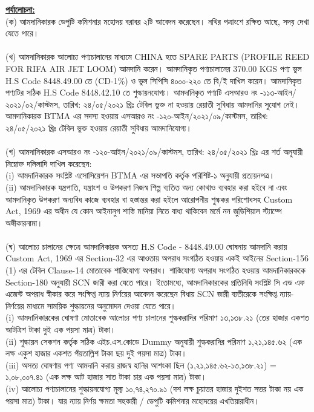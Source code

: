 \documentclass[12pt]{article}
\newcommand{\hscode}{8448.42.10}
\newcommand{\sroooth}{এসআরও নং -১১৩-আইন/২০২১/০২/কাস্টমস}
\newcommand{\srooothd}{তারিখ: ২৪/০৫/২০২১ খ্রিঃ}
\newcommand{\srooot}{এসআরও নং -১২০-আইন/২০২১/০৯/কাস্টমস}
\newcommand{\sroootd}{তারিখ: ২৪/০৫/২০২১ খ্রিঃ}
\begin{document}
\begin{minipage}[t]{0.95\linewidth}
\underline{\textbf{পর্যালোচনা:}}
\\
(ক) আমদানিকারক ডেপুটি কমিশনার মহোদয় বরাবর
২টি আবেদন করেছেন। নথির পত্রাংশে রক্ষিত আছে, সদয়
দেখা যেতে পারে।
\\
\\
(খ) আমদানিকারক আলোচ্য পণ্যচালানের মাধ্যমে CHINA
হতে SPARE PARTS (PROFILE REED FOR RIFA AIR JET LOOM) আমদানি করেন। আমদানিকৃত পণ্যচালানের
370.00 KGS পণ্য ভুল H.S Code 8448.49.00
তে (CD-1\%) ও ভুল সিপিসি ৪০০০-২২০ তে বি/ই
দাখিল করেন। আমদানিকৃত পণ্যটির সঠিক H.S Code
{\hscode} তে শুল্কায়নযোগ্য। আমদানিকৃত পণ্যটি
{\sroooth}, {\srooothd} টেবিল ভুক্ত না হওয়ায় রেয়াতী সুবিধায়
আমদানির সুযোগ নেই। আমদানিকারক BTMA এর
সদস্য হওয়ায় {\srooot}, {\sroootd} টেবিল ভুক্ত হওয়ায় রেয়াতী সুবিধায় আমদানিযোগ্য।
\\
\\
(গ) আমদানিকারক {\srooot}, {\sroootd} এর শর্ত অনুযায়ী নিম্নোক্ত
দলিলাদি দাখিল করেছেন:
\\
(i) আমদানিকারক সংশ্লিষ্ট এসোসিয়েশন
BTMA এর সভাপতি কর্তৃক পরিশিষ্ট-১
অনুযায়ী প্রত্যয়নপত্র।
\\
(ii) আমদানিকারক যন্ত্রপাতি, যন্ত্রাংশ ও উপকরণ
নিজস্ব শিল্প ব্যতিত অন্য কোথাও ব্যবহার করা হইবে না
এবং আমদানিকৃত উপকরণ অন্যবিধ কাজে ব্যবহার বা
হস্তান্তর করা হইলে আরোপনীয় শুল্ককর পরিশোধসহ
Custom Act, 1969 এর অধীন যে কোন আইনানুগ
শাস্তি মানিয়া নিতে বাধ্য থাকিবেন মর্মে নন জুডিশিয়াল
স্ট্যাম্পে অঙ্গীকারনামা।
\\
\\
(ঘ) আলোচ্য চালানের ক্ষেত্রে আমদানিকারক অসত্য
H.S Code - 8448.49.00 ঘোষনায় আমদানি করায় Custom Act,
1969 এর Section-32 এর আওতায় অপরাধ সংগঠিত
হওয়ায় একই আইনের Section-156 (1) এর টেবিল
Clause-14 মোতাবেক শাস্তিযোগ্য অপরাধ। শাস্তিযোগ্য
অপরাধ সংগঠিত হওয়ায় আমদানিকারককে Section-180
অনুযায়ী SCN জারী করা যেতে পারে।
ইতোমধ্যে, আমদানিকারকের প্রতিনিধি সংশ্লিষ্ট
সি এন্ড এফ এজেন্ট অপরাধ স্বীকার করে সংক্ষিপ্ত
ন্যায় নির্ণয়ের আবেদন করেছেন বিধায় SCN জারী ব্যতীরেকে
সংক্ষিপ্ত ন্যায়-নির্ণয়ের মাধ্যমে সাময়িক শুল্কায়নের
অনুমোদন দেওয়া যেতে পারে।
\\
(i) আমদানিকারকের ঘোষণা মোতাবেক আলোচ্য
পণ্য চালানের শুল্ককরাদির পরিমাণ
১৩,১৩৮.২১ (তের হাজার একশত আটত্রিশ টাকা দুই এক পয়সা মাত্র) টাকা।
\\
(ii) শুল্কায়ন সেকশন কর্তৃক সঠিক এইচ.এস.কোডে
Dummy অনুযায়ী শুল্ককরাদির পরিমাণ
১,২১,১৪৫.৬২ (এক লক্ষ একুশ হাজার একশত পঁয়তাল্লিশ টাকা ছয় দুই পয়সা মাত্র)
টাকা।
\\
(iii) অসত্য ঘোষণায় পণ্য আমদানি করায়
রাজস্ব হানির আশংকা ছিল
(১,২১,১৪৫.৬২-১৩,১৩৮.২১) = ১,০৮,০০৭.৪১
(এক লক্ষ আট হাজার সাত টাকা চার এক পয়সা মাত্র) টাকা।
\\
(iv) আলোচ্য পণ্যচালানের শুল্কায়নযোগ্য মূল্য
১০,৭৪,২৭০.৯১ (দশ লক্ষ চুয়াত্তর হাজার দুইশত সত্তর টাকা নয় এক পয়সা মাত্র) টাকা।
যার ন্যায় নির্ণয় ক্ষমতা সহকারী / ডেপুটি কমিশনার
মহোদয়ের এখতিয়ারাধীন।
\end{minipage}
\end{document}
